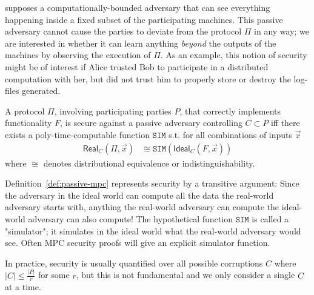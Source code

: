 \documentclass[acmlarge, manuscript, screen, review, anonymous, table]{acmart}
\begin{document}
supposes a computationally-bounded adversary
that can see everything happening inside a fixed subset of the participating machines.
This passive adversary cannot cause the parties to deviate from the protocol $Π$ in any way;
we are interested in whether it can learn anything \emph{beyond} the outputs of the  machines
by observing the execution of $Π$.
As an example, this notion of security might be of interest if Alice trusted Bob to participate
in a distributed computation with her, but did not trust him to properly store or destroy the log-files
generated.

\begin{definition}\label{def:passive-mpc}
  \begin{samepage}
    A protocol $Π$,
    involving participating parties $P$,
    that correctly implements functionality $F$,
    is secure against a passive adversary controlling $C \subset P$ iff
    there exists a poly-time-computable function $\mathtt{SIM}$ s.t.
    for all combinations of inputs $\vec{x}$
    $$\begin{aligned}
        \mathsf{Real}_C(Π, \vec{x}) &\cong \mathtt{SIM}(\mathsf{Ideal}_C(F,\vec{x}))
    \end{aligned}$$
    where $\cong$ denotes distributional equivalence or indistinguishability.
  \end{samepage}
\end{definition}

Definition~\ref{def:passive-mpc} represents security by a transitive argument:
Since the adversary in the ideal world can compute all the data the real-world adversary starts with,
anything the real-world adversary can compute the ideal-world adversary can also compute!
The hypothetical function $\mathtt{SIM}$ is called a "simulator";
it simulates in the ideal world what the real-world adversary would see.
Often MPC security proofs will give an explicit simulator function.

In practice, security is usually quantified over all possible corruptions $C$
where $\lvert C \rvert \leq \frac{\lvert P \rvert}{r}$ for some $r$, but this is not fundamental and we only consider a single $C$ at a time.
\end{document}
